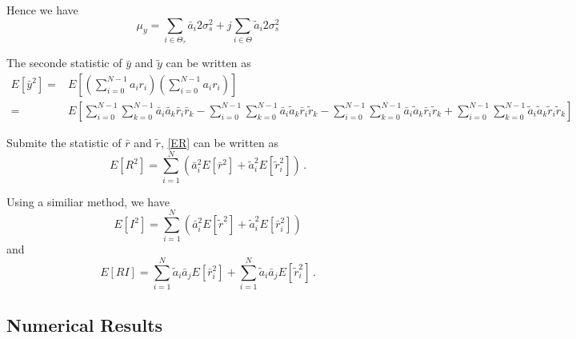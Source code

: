 Hence we have 
\begin{equation}
\label{muy}
\mu_y = \sum_{i\in\Theta_\tau}\bar{a}_i2\sigma_s^2 + j\sum_{i\in\Theta}\tilde{a}_i2\sigma_s^2
\end{equation}

The seconde statistic of $\bar{y}$ and $\tilde{y}$ can be written as
\begin{equation}
\begin{split}
  E[\bar{y}^2] = &E[(\sum_{i=0}^{N-1} a_ir_i)(\sum_{i=0}^{N-1} a_ir_i)]\\
  = &E[\sum_{i=0}^{N-1}\sum_{k=0}^{N-1}\bar{a}_i\bar{a}_k\bar{r}_i\bar{r}_k - \sum_{i=0}^{N-1}\sum_{k=0}^{N-1}\bar{a}_i\tilde{a}_k\bar{r}_i\tilde{r}_k - \sum_{i=0}^{N-1}\sum_{k=0}^{N-1}\bar{a}_i\tilde{a}_k\bar{r}_i\tilde{r}_k + \sum_{i=0}^{N-1}\sum_{k=0}^{N-1}\tilde{a}_i\tilde{a}_k\tilde{r}_i\tilde{r}_k]
  \end{split}
  \label{ER}
\end{equation}

Submite the statistic of $\bar{r}$ and $\tilde{r}$, \eqref{ER} can be written as
\begin{equation}
  E[R^2] = \sum_{i=1}^N(\bar{a}_i^2E[\bar{r}^2] + \tilde{a}_i^2E[\tilde{r}_i^2])\,.
  \label{ER2}
\end{equation}

Using a similiar method, we have 
\begin{equation}
  E[I^2] = \sum_{i=1}^N(\bar{a}_i^2E[\tilde{r}^2] + \tilde{a}_i^2E[\bar{r}_i^2])
  \label{EI2}
\end{equation}
and
\begin{equation}
  E[RI]=\sum_{i=1}^N\tilde{a}_i\bar{a}_jE[\bar{r}_i^2] + \sum_{i=1}^N\tilde{a}_i\bar{a}_jE[\tilde{r}_i^2] \,.
  \label{ERI}
\end{equation}





\subsection{Numerical Results}

